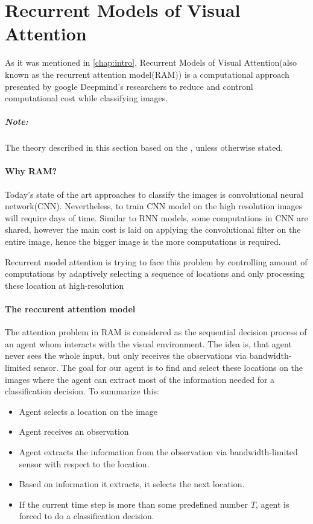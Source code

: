 \section{Recurrent Models of Visual Attention}
\label{sec:ram_model}
As it was mentioned in \autoref{chap:intro}, Recurrent Models of Visual
Attention(also known as the recurrent attention model(RAM)) is
a computational approach presented by google Deepmind’s researchers to reduce
and contronl computational cost while classifying images.
\subparagraph{Note: } The theory described in this section based on the
\cite{DBLP:journals/corr/MnihHGK14}, unless otherwise stated.

\paragraph{Why RAM?}
Today's state of the art approaches to classify the images is convolutional
neural network(CNN). Nevertheless, to train CNN model on the high resolution
images will require days of time. Similar to RNN models, some computations
in CNN are shared, however the main cost is laid on applying the convolutional
filter on the entire image, hence the bigger image is the
more computations is required.\cite{Krizhevsky2012}

Recurrent model attention is trying to face this problem by
controlling amount of computations by adaptively selecting a sequence of
locations and only processing these location at high-resolution


\paragraph{The reccurent attention model}
The attention problem in RAM is considered as the sequential decision
process of an agent whom interacts with the visual environment. The idea is,
that agent never sees the whole input, but only receives the observations
via bandwidth-limited sensor. The goal for our agent is
to find and select these locations on the images where the agent can extract
most of the information needed for a classification decision.
To summarize this:
\begin{itemize}
	\item Agent selects a location on the image
	\item Agent receives an observation
	\item Agent extracts the information from the observation via bandwidth-limited
		sensor with respect to the location.
	\item Based on information it extracts, it selects the next location.
	\item If the current time step is
		more than some predefined number $T$, agent is forced to do a
		classification decision.
\end{itemize}

